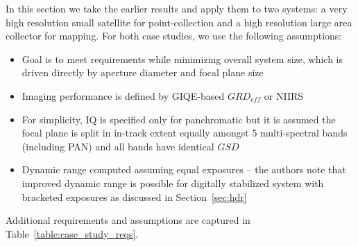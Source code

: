 \documentclass[]{spieman}  %
\begin{document}
In this section we take the earlier results and apply them to two systems: a very high resolution small satellite for point-collection and a high resolution large area collector for mapping.  For both case studies, we use the following assumptions:

\begin{itemize}
    \item Goal is to meet requirements while minimizing overall system size, which is driven directly by aperture diameter and focal plane size
    \item Imaging performance is defined by GIQE-based $GRD_{eff}$ or NIIRS
    \item For simplicity, IQ is specified only for panchromatic but it is assumed the focal plane is split in in-track extent equally amongst 5 multi-spectral bands (including PAN) and all bands have identical $GSD$
    \item Dynamic range computed assuming equal exposures -- the authors note that improved dynamic range is possible for digitally stabilized system with bracketed exposures as discussed in Section~\ref{sec:hdr}
\end{itemize}

Additional requirements and assumptions are captured in Table~\ref{table:case_study_reqs}.
\end{document}
